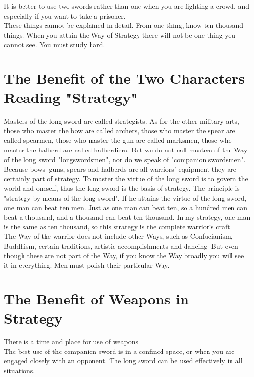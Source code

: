 It is better to use two swords rather than one when you are fighting a crowd, and especially if you want to take a prisoner.\\

These things cannot be explained in detail. From one thing, know ten thousand things. When you attain the Way of Strategy there will not be one thing you cannot see. You must study hard.\\
\section{The Benefit of the Two Characters Reading "Strategy"}

Masters of the long sword are called strategists. As for the other military arts, those who master the bow are called archers, those who master the spear are called spearmen, those who master the gun are called marksmen, those who master the halberd are called halberdiers. But we do not call masters of the Way of the long sword "longswordsmen", nor do we speak of "companion swordsmen". Because bows, guns, spears and halberds are all warriors' equipment they are certainly part of strategy. To master the virtue of the long sword is to govern the world and oneself, thus the long sword is the basis of strategy. The principle is "strategy by means of the long sword". If he attains the virtue of the long sword, one man can beat ten men. Just as one man can beat ten, so a hundred men can beat a thousand, and a thousand can beat ten thousand. In my strategy, one man is the same as ten thousand, so this strategy is the complete warrior's craft.\\

The Way of the warrior does not include other Ways, such as Confucianism, Buddhism, certain traditions, artistic accomplishments and dancing. But even though these are not part of the Way, if you know the Way broadly you will see it in everything. Men must polish their particular Way.\\
\section{The Benefit of Weapons in Strategy}

There is a time and place for use of weapons.\\

The best use of the companion sword is in a confined space, or when you are engaged closely with an opponent. The long sword can be used effectively in all situations.\\

